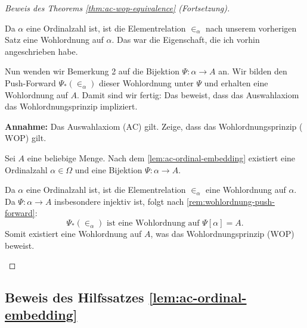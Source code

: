 \begin{proof}[Beweis des Theorems \ref{thm:ac-wop-equivalence} (Fortsetzung)]
\begin{spoken-clean}[01:01:59 - 01:03:41]
Da $\alpha$ eine Ordinalzahl ist, ist die Elementrelation $\in_\alpha$ nach unserem vorherigen Satz eine Wohlordnung auf $\alpha$. Das war die Eigenschaft, die ich vorhin angeschrieben habe.

Nun wenden wir Bemerkung 2 auf die Bijektion $\Psi \colon \alpha \to A$ an. Wir bilden den Push-Forward $\Psi_*(\in_\alpha)$ dieser Wohlordnung unter $\Psi$ und erhalten eine Wohlordnung auf $A$. Damit sind wir fertig: Das beweist, dass das Auswahlaxiom das Wohlordnungsprinzip impliziert.
\end{spoken-clean}

\begin{math-stroke}
\begin{short-proof}
\textbf{Annahme:} Das Auswahlaxiom ($\text{AC}$) gilt. Zeige, dass das Wohlordnungsprinzip ($\text{WOP}$) gilt.

Sei $A$ eine beliebige Menge. Nach dem \cref{lem:ac-ordinal-embedding} existiert eine Ordinalzahl $\alpha \in \Omega$ und eine Bijektion $\Psi \colon \alpha \to A$.

Da $\alpha$ eine Ordinalzahl ist, ist die Elementrelation $\in_\alpha$ eine Wohlordnung auf $\alpha$.
Da $\Psi \colon \alpha \to A$ insbesondere injektiv ist, folgt nach \cref{rem:wohlordnung-push-forward}:
\[
\Psi_*(\in_\alpha) \text{ ist eine Wohlordnung auf } \Psi[\alpha] = A.
\]
Somit existiert eine Wohlordnung auf $A$, was das Wohlordnungsprinzip ($\text{WOP}$) beweist.
\end{short-proof}
\end{math-stroke}
\end{proof}

\subsection{Beweis des Hilfssatzes \ref{lem:ac-ordinal-embedding}}

